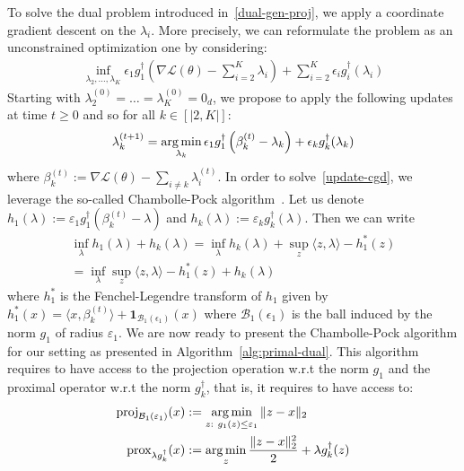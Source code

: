 To solve the dual problem introduced in~\eqref{dual-gen-proj}, we apply a coordinate gradient descent on the $\lambda_i$. More precisely, we can reformulate the problem as an unconstrained optimization one by considering:
\begin{align*}
\inf_{\lambda_2,\dots,\lambda_K} \epsilon_1 g_1^{\dagger}\left(\nabla\mathcal{L}(\theta) - \sum_{i=2}^K\lambda_i\right) +\sum_{i=2}^K \epsilon_i g^\dagger_i(\lambda_i)
\end{align*}
Starting with $\lambda_2^{(0)}=\dots=\lambda_K^{(0)}=0_d$, we propose to apply the following updates at time $t\geq 0$ and so for all $k\in[|2,K|]$:
\begin{align}
\label{update-cgd}
\lambda_{k}^{(t+1)}=\operatorname*{arg\,min}_{\lambda_k} \epsilon_1 g_1^{\dagger}\left(\beta_k^{(t)}- \lambda_k \right) + \epsilon_k g^\dagger_k(\lambda_k)
\end{align}
where $\beta_k^{(t)}:=\nabla\mathcal{L}(\theta) - \sum\limits_{i\neq k}\lambda_i^{(t)}$. In order to solve~\eqref{update-cgd}, we leverage the so-called Chambolle-Pock algorithm~\cite{chambolle2011first}. Let us denote $h_1(\lambda):=\varepsilon_1 g_1^{\dagger}(\beta_k^{(t)}-\lambda)$ and $h_k(\lambda):=\varepsilon_k g_k^{\dagger}(\lambda)$. Then we can write
\begin{align*}
    \inf_{\lambda} h_1(\lambda) + h_k(\lambda) = \inf_{\lambda} h_k(\lambda) + \sup_{z} \langle z, \lambda\rangle - h_1^*(z)\\
    = \inf_{\lambda}\sup_{z} \langle z,\lambda\rangle - h_1^{*}(z) + h_k(\lambda)
\end{align*}
where $h_1^*$ is the Fenchel-Legendre transform of $h_1$ given by $h_1^{*}(x)=\langle x, \beta_k^{(t)}\rangle + \bm{1}_{\mathcal{B}_{1}(\epsilon_1)}(x)$
where $\mathcal{B}_{1}(\epsilon_1)$ is the ball induced by the norm $g_1$ of radius $\varepsilon_1$. We are now ready to present the Chambolle-Pock algorithm for our setting as presented in Algorithm~\ref{alg:primal-dual}. This algorithm requires to have access to the projection operation w.r.t the norm $g_1$ and the proximal operator w.r.t the norm $g_k^{\dagger}$, that is, it requires to have access to:
\begin{align*}
    \text{proj}_{\mathcal{B}_1(\varepsilon_1)}(x)&:=\operatorname*{arg\,min}_{z:~g_1(z)\leq \varepsilon_1}\Vert z - x\Vert_2\\
    \text{prox}_{\lambda g_k^{\dagger}}(x)&:=\operatorname*{arg\,min}_{z}\frac{\Vert z - x\Vert_2^2}{2} + \lambda g_k^{\dagger}(z)
    \end{align*}

